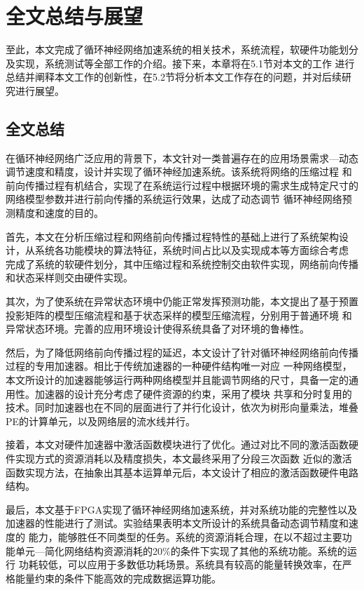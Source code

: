 \chapter{全文总结与展望}
至此，本文完成了循环神经网络加速系统的相关技术，系统流程，软硬件功能划分及实现，系统测试等全部工作的介绍。接下来，本章将在5.1节对本文的工作
进行总结并阐释本文工作的创新性，在5.2节将分析本文工作存在的问题，并对后续研究进行展望。
\section{全文总结}
在循环神经网络广泛应用的背景下，本文针对一类普遍存在的应用场景需求---动态调节速度和精度，设计并实现了循环神经加速系统。该系统将网络的压缩过程
和前向传播过程有机结合，实现了在系统运行过程中根据环境的需求生成特定尺寸的网络模型参数并进行前向传播的系统运行效果，达成了动态调节
循环神经网络预测精度和速度的目的。

首先，本文在分析压缩过程和网络前向传播过程特性的基础上进行了系统架构设计，从系统各功能模块的算法特征，系统时间占比以及实现成本等方面综合考虑
完成了系统的软硬件划分，其中压缩过程和系统控制交由软件实现，网络前向传播和状态采样则交由硬件实现。

其次，为了使系统在异常状态环境中仍能正常发挥预测功能，本文提出了基于预置投影矩阵的模型压缩流程和基于状态采样的模型压缩流程，分别用于普通环境
和异常状态环境。完善的应用环境设计使得系统具备了对环境的鲁棒性。

然后，为了降低网络前向传播过程的延迟，本文设计了针对循环神经网络前向传播过程的专用加速器。相比于传统加速器的一种硬件结构唯一对应
一种网络模型，本文所设计的加速器能够运行两种网络模型并且能调节网络的尺寸，具备一定的通用性。加速器的设计充分考虑了硬件资源的约束，采用了模块
共享和分时复用的技术。同时加速器也在不同的层面进行了并行化设计，依次为树形向量乘法，堆叠PE的计算单元，以及网络层的流水线并行。

接着，本文对硬件加速器中激活函数模块进行了优化。通过对比不同的激活函数硬件实现方式的资源消耗以及精度损失，本文最终采用了分段三次函数
近似的激活函数实现方法，在抽象出其基本运算单元后，本文设计了相应的激活函数硬件电路结构。

最后，本文基于FPGA实现了循环神经网络加速系统，并对系统功能的完整性以及加速器的性能进行了测试。实验结果表明本文所设计的系统具备动态调节精度和速度的
能力，能够胜任不同类型的任务。系统的资源消耗合理，在以不超过主要功能单元---简化网络结构资源消耗的20\%的条件下实现了其他的系统功能。系统的运行
功耗较低，可以应用于多数低功耗场景。系统具有较高的能量转换效率，在严格能量约束的条件下能高效的完成数据运算功能。

